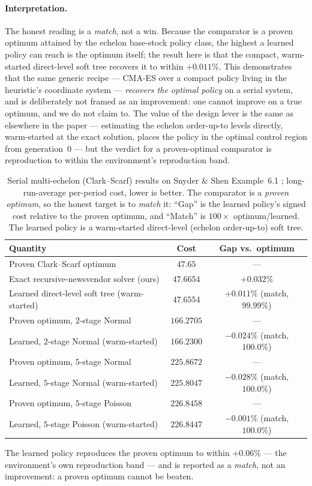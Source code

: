\documentclass[11pt]{article}
\begin{document}
\paragraph{Interpretation.}
The honest reading is a \emph{match}, not a win. Because the comparator is a proven optimum attained by
the echelon base-stock policy class, the highest a learned policy can reach is the optimum itself; the
result here is that the compact, warm-started direct-level soft tree recovers it to within
$+0.011\%$. This demonstrates that the same generic recipe --- CMA-ES over a compact policy living in
the heuristic's coordinate system --- \emph{recovers the optimal policy} on a serial system, and is
deliberately not framed as an improvement: one cannot improve on a true optimum, and we do not claim
to. The value of the design lever is the same as elsewhere in the paper --- estimating the echelon
order-up-to levels directly, warm-started at the exact solution, places the policy in the optimal
control region from generation~$0$ --- but the verdict for a proven-optimal comparator is reproduction
to within the environment's reproduction band.

\begin{table}[!htbp]
\centering
\caption{Serial multi-echelon (Clark--Scarf) results on Snyder \& Shen Example~6.1
\citep{snyder2019foundations}; long-run-average per-period cost, lower is better. The comparator is a
\emph{proven optimum}, so the honest target is to \emph{match} it: ``Gap'' is the learned policy's
signed cost relative to the proven optimum, and ``Match'' is $100\times$ optimum/learned. The learned
policy is a warm-started direct-level (echelon order-up-to) soft tree.}
\label{tab:serial-results}
\begin{tabular}{lcc}
\toprule
Quantity & Cost & Gap vs.\ optimum \\
\midrule
Proven Clark--Scarf optimum \citep{snyder2019foundations} & $47.65$ & --- \\
Exact recursive-newsvendor solver (ours) & $47.6654$ & $+0.032\%$ \\
Learned direct-level soft tree (warm-started) & $47.6554$ & $+0.011\%$ (match, $99.99\%$) \\
\midrule
Proven optimum, $2$-stage Normal & $166.2705$ & --- \\
Learned, $2$-stage Normal (warm-started) & $166.2300$ & $-0.024\%$ (match, $100.0\%$) \\
Proven optimum, $5$-stage Normal & $225.8672$ & --- \\
Learned, $5$-stage Normal (warm-started) & $225.8047$ & $-0.028\%$ (match, $100.0\%$) \\
Proven optimum, $5$-stage Poisson & $226.8458$ & --- \\
Learned, $5$-stage Poisson (warm-started) & $226.8447$ & $-0.001\%$ (match, $100.0\%$) \\
\bottomrule
\end{tabular}
\par\medskip\footnotesize The learned policy reproduces the proven optimum to within $+0.06\%$ --- the
environment's own reproduction band --- and is reported as a \emph{match}, not an improvement: a proven
optimum cannot be beaten.
\end{table}
\FloatBarrier
\end{document}
